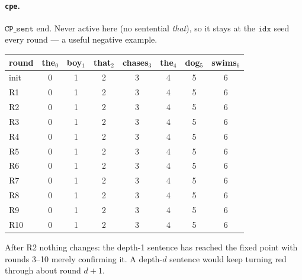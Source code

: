\documentclass[10pt]{article}
\begin{document}
\paragraph{\texttt{cpe}.} $\texttt{CP\_sent}$ end. Never active here (no sentential \emph{that}), so it stays at the $\texttt{idx}$ seed every round --- a useful negative example.
\begin{center}\footnotesize\setlength{\tabcolsep}{4pt}\renewcommand{\arraystretch}{1.1}
\begin{tabular}{@{}l|ccccccc@{}}
\toprule \textbf{round} & the$_{0}$ & boy$_{1}$ & that$_{2}$ & chases$_{3}$ & the$_{4}$ & dog$_{5}$ & swims$_{6}$ \\ \midrule
init & 0 & 1 & 2 & 3 & 4 & 5 & 6 \\
R1 & 0 & 1 & 2 & 3 & 4 & 5 & 6 \\
R2 & 0 & 1 & 2 & 3 & 4 & 5 & 6 \\
R3 & 0 & 1 & 2 & 3 & 4 & 5 & 6 \\
R4 & 0 & 1 & 2 & 3 & 4 & 5 & 6 \\
R5 & 0 & 1 & 2 & 3 & 4 & 5 & 6 \\
R6 & 0 & 1 & 2 & 3 & 4 & 5 & 6 \\
R7 & 0 & 1 & 2 & 3 & 4 & 5 & 6 \\
R8 & 0 & 1 & 2 & 3 & 4 & 5 & 6 \\
R9 & 0 & 1 & 2 & 3 & 4 & 5 & 6 \\
R10 & 0 & 1 & 2 & 3 & 4 & 5 & 6 \\
\bottomrule\end{tabular}\end{center}
After R2 nothing changes: the depth-1 sentence has reached the fixed point with rounds 3--10 merely confirming it. A depth-$d$ sentence would keep turning red through about round $d{+}1$.
\end{document}
